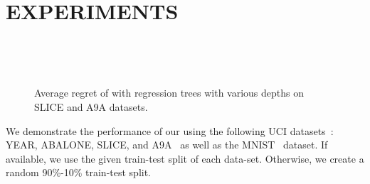 \section{EXPERIMENTS}
\begin{figure*}[t]
    \centering
    ~
    
    ~
    \caption{Average regret of \algshort with regression trees with various depths on SLICE and A9A datasets.}
    \label{fig:regret}
\end{figure*}

We demonstrate the performance of our \algname using the following UCI datasets~\citep{Lichman:2013}: YEAR, ABALONE, SLICE, and A9A~\citep{adult} as well as the  MNIST~\citep{mnist} dataset. If available, we use the given train-test split of each data-set. Otherwise, we create a random 90\%-10\% train-test split. 

    
    
    
